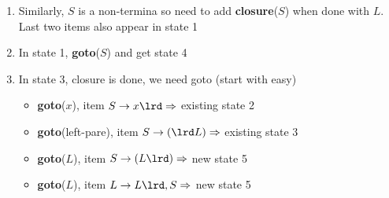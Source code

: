 \begin{enumerate}
\item[] Similarly, $S$ is a non-termina so need to add \textbf{closure}($S$) when done with $L$. Last two items also appear in state 1
  \begin{center}
  \end{center}
\item In state 1, \textbf{goto}($S$) and get state 4
  \begin{center}
  \end{center}
\item In state 3, closure is done, we need goto (start with easy)
  \begin{itemize}
  \item \textbf{goto}($x$), item $S\to x\lrd \Rightarrow$ existing state 2
  \item \textbf{goto}(\textsf{left-pare}), item $S\to (\lrd L)\Rightarrow$ existing state 3
  \item \textbf{goto}($L$), item $S\to (L\lrd)\Rightarrow$ new state 5
  \item \textbf{goto}($L$), item $L\to L\lrd,S\Rightarrow$ new state 5
  \begin{center}
\end{center}
\end{itemize}
\end{enumerate}
